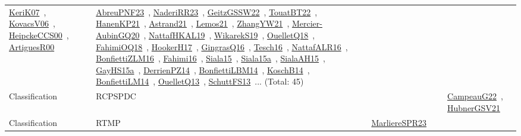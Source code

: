 {\begin{longtable}{lp{3cm}>{\raggedright\arraybackslash}p{6cm}>{\raggedright\arraybackslash}p{6cm}>{\raggedright\arraybackslash}p{8cm}}
\href{../works/KeriK07.pdf}{KeriK07}~\cite{KeriK07}, \href{../works/KovacsV06.pdf}{KovacsV06}~\cite{KovacsV06}, \href{../works/HeipckeCCS00.pdf}{HeipckeCCS00}~\cite{HeipckeCCS00}, \href{../works/ArtiguesR00.pdf}{ArtiguesR00}~\cite{ArtiguesR00} & \href{../works/AbreuPNF23.pdf}{AbreuPNF23}~\cite{AbreuPNF23}, \href{../works/NaderiRR23.pdf}{NaderiRR23}~\cite{NaderiRR23}, \href{../works/GeitzGSSW22.pdf}{GeitzGSSW22}~\cite{GeitzGSSW22}, \href{../works/TouatBT22.pdf}{TouatBT22}~\cite{TouatBT22}, \href{../works/HanenKP21.pdf}{HanenKP21}~\cite{HanenKP21}, \href{../works/Astrand21.pdf}{Astrand21}~\cite{Astrand21}, \href{../works/Lemos21.pdf}{Lemos21}~\cite{Lemos21}, \href{../works/ZhangYW21.pdf}{ZhangYW21}~\cite{ZhangYW21}, \href{../works/Mercier-AubinGQ20.pdf}{Mercier-AubinGQ20}~\cite{Mercier-AubinGQ20}, \href{../works/NattafHKAL19.pdf}{NattafHKAL19}~\cite{NattafHKAL19}, \href{../works/WikarekS19.pdf}{WikarekS19}~\cite{WikarekS19}, \href{../works/OuelletQ18.pdf}{OuelletQ18}~\cite{OuelletQ18}, \href{../works/FahimiOQ18.pdf}{FahimiOQ18}~\cite{FahimiOQ18}, \href{../works/HookerH17.pdf}{HookerH17}~\cite{HookerH17}, \href{../works/GingrasQ16.pdf}{GingrasQ16}~\cite{GingrasQ16}, \href{../works/Tesch16.pdf}{Tesch16}~\cite{Tesch16}, \href{../works/NattafALR16.pdf}{NattafALR16}~\cite{NattafALR16}, \href{../works/BonfiettiZLM16.pdf}{BonfiettiZLM16}~\cite{BonfiettiZLM16}, \href{../works/Fahimi16.pdf}{Fahimi16}~\cite{Fahimi16}, \href{../works/Siala15.pdf}{Siala15}~\cite{Siala15}, \href{../works/Siala15a.pdf}{Siala15a}~\cite{Siala15a}, \href{../works/SialaAH15.pdf}{SialaAH15}~\cite{SialaAH15}, \href{../works/GayHS15a.pdf}{GayHS15a}~\cite{GayHS15a}, \href{../works/DerrienPZ14.pdf}{DerrienPZ14}~\cite{DerrienPZ14}, \href{../works/BonfiettiLBM14.pdf}{BonfiettiLBM14}~\cite{BonfiettiLBM14}, \href{../works/KoschB14.pdf}{KoschB14}~\cite{KoschB14}, \href{../works/BonfiettiLM14.pdf}{BonfiettiLM14}~\cite{BonfiettiLM14}, \href{../works/OuelletQ13.pdf}{OuelletQ13}~\cite{OuelletQ13}, \href{../works/SchuttFS13.pdf}{SchuttFS13}~\cite{SchuttFS13}... (Total: 45)\\
Classification & RCPSPDC &  &  & \href{../works/CampeauG22.pdf}{CampeauG22}~\cite{CampeauG22}, \href{../works/HubnerGSV21.pdf}{HubnerGSV21}~\cite{HubnerGSV21}\\
Classification & RTMP & \href{../works/MarliereSPR23.pdf}{MarliereSPR23}~\cite{MarliereSPR23} &  & \\

\end{longtable}}
